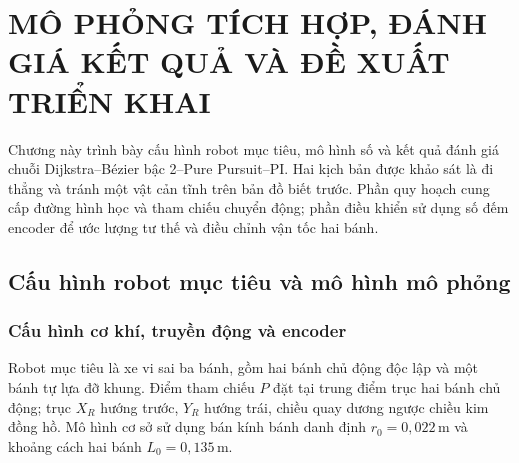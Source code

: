 \documentclass[12pt,a4paper,oneside]{report}
\begin{document}
\chapter{MÔ PHỎNG TÍCH HỢP, ĐÁNH GIÁ KẾT QUẢ VÀ ĐỀ XUẤT TRIỂN KHAI}
\label{chap:c4-doclap}

Chương này trình bày cấu hình robot mục tiêu, mô hình số và kết quả đánh giá chuỗi Dijkstra--Bézier bậc 2--Pure Pursuit--PI. Hai kịch bản được khảo sát là đi thẳng và tránh một vật cản tĩnh trên bản đồ biết trước. Phần quy hoạch cung cấp đường hình học và tham chiếu chuyển động; phần điều khiển sử dụng số đếm encoder để ước lượng tư thế và điều chỉnh vận tốc hai bánh.

\section{Cấu hình robot mục tiêu và mô hình mô phỏng}

\subsection{Cấu hình cơ khí, truyền động và encoder}

Robot mục tiêu là xe vi sai ba bánh, gồm hai bánh chủ động độc lập và một bánh tự lựa đỡ khung. Điểm tham chiếu \(P\) đặt tại trung điểm trục hai bánh chủ động; trục \(X_R\) hướng trước, \(Y_R\) hướng trái, chiều quay dương ngược chiều kim đồng hồ. Mô hình cơ sở sử dụng bán kính bánh danh định \(r_0=0{,}022\,\mathrm{m}\) và khoảng cách hai bánh \(L_0=0{,}135\,\mathrm{m}\).
\end{document}
